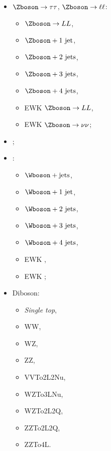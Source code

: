 \begin{minipage}[t]{.3\textwidth}
\begin{itemize}
\item $\Zboson\to\tau\tau$, $\Zboson\to\ell\ell$:
\begin{itemize}
\item $\Zboson \to LL$,
\item $\Zboson+\text{1 jet}$,
\item $\Zboson+\text{2 jets}$,
\item $\Zboson+\text{3 jets}$,
\item $\Zboson+\text{4 jets}$,
\item EWK $\Zboson\to LL$,
\item EWK $\Zboson\to \nu\nu$;
\end{itemize}
\item \ttbar;
\end{itemize}
\end{minipage}
\hfill
\begin{minipage}[t]{.3\textwidth}
\begin{itemize}
\item \Wjets:
\begin{itemize}
\item $\Wboson+\text{jets}$,
\item $\Wboson+\text{1 jet}$,
\item $\Wboson+\text{2 jets}$,
\item $\Wboson+\text{3 jets}$,
\item $\Wboson+\text{4 jets}$,
\item EWK \Wbosonminus,
\item EWK \Wbosonplus;
\end{itemize}
\end{itemize}
\end{minipage}
\hfill
\begin{minipage}[t]{.3\textwidth}
\begin{itemize}
\item Diboson:
\begin{itemize}
\item \emph{Single top},
\item WW,
\item WZ,
\item ZZ,
\item VVTo2L2Nu,
\item WZTo3LNu,
\item WZTo2L2Q,
\item ZZTo2L2Q,
\item ZZTo4L.
\end{itemize}
\end{itemize}
\end{minipage}

